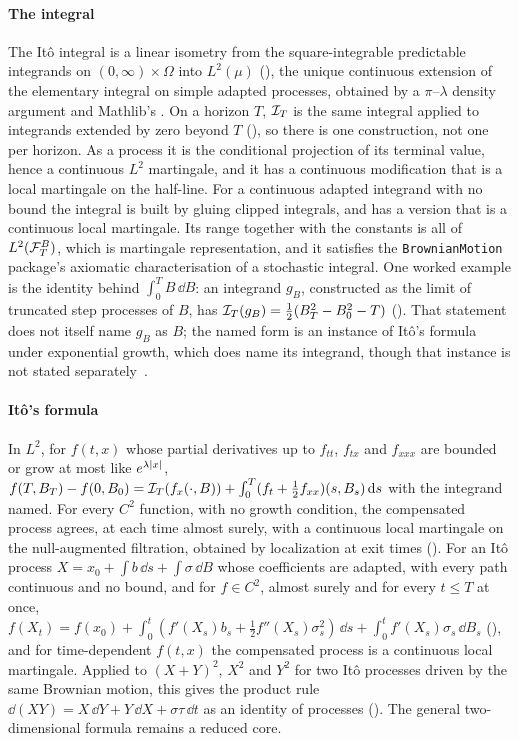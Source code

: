 \documentclass[11pt]{article}
\begin{document}
\paragraph{The integral}
The It\^o integral is a linear isometry from the square-integrable predictable integrands on $(0,\infty)\times\Omega$
into $L^2(\mu)$ (), the unique continuous extension of the elementary integral on simple adapted
processes, obtained by a $\pi$--$\lambda$ density argument and Mathlib's . On a horizon $T$,
$\mathcal{I}_T$ is the same integral applied to integrands extended by zero beyond $T$ (), so there is one
construction, not one per horizon. As a process it is
the conditional projection of its terminal value, hence a continuous $L^2$ martingale, and it has a continuous
modification that is a local martingale on the half-line. For a continuous adapted integrand with no bound the integral
is built by gluing clipped integrals, and has a version that is a continuous local martingale. Its range together with
the constants is all of $L^2(\mathcal{F}^B_T)$, which is martingale representation, and it satisfies the \texttt{BrownianMotion}
package's axiomatic characterisation of a stochastic integral. One worked example is the identity behind
$\int_0^TB\,\dd B$: an integrand $g_B$, constructed as the limit of truncated step processes of $B$, has
$\mathcal{I}_T(g_B)=\frac12(B_T^2-B_0^2-T)$ (). That statement does not itself name $g_B$ as $B$; the
named form is an instance of It\^o's formula under exponential growth, which does name its integrand, though that
instance is not stated separately~\cite{CoelhoIto}.

\paragraph{It\^o's formula}
In $L^2$, for $f(t,x)$ whose partial derivatives up to $f_{tt}$, $f_{tx}$ and $f_{xxx}$ are bounded or grow at most like
$e^{\lambda\lvert x\rvert}$, $f(T,B_T)-f(0,B_0)=\mathcal{I}_T(f_x(\cdot,B))+\int_0^T(f_t+\frac12f_{xx})(s,B_s)\,\mathrm{d} s$ with the integrand
named. For every $C^2$ function, with no growth condition, the compensated process agrees, at each time almost surely, with a continuous local martingale on the null-augmented filtration, obtained by localization at exit times (). For an It\^o process
$X=x_0+\int b\,\dd s+\int\sigma\,\dd B$ whose coefficients are adapted, with every path continuous and no bound, and for
$f\in C^2$, almost surely and for every $t\le T$ at once,
$f(X_t)=f(x_0)+\int_0^t(f'(X_s)b_s+\frac12f''(X_s)\sigma_s^2)\,\dd s+\int_0^tf'(X_s)\sigma_s\,\dd B_s$
(), and for time-dependent $f(t,x)$ the compensated process is a continuous
local martingale. Applied to $(X+Y)^2$, $X^2$ and $Y^2$ for two It\^o processes driven by the same Brownian motion, this
gives the product rule $\dd(XY)=X\,\dd Y+Y\,\dd X+\sigma\tau\,\dd t$ as an identity of processes
(). The general two-dimensional formula remains a reduced core.
\end{document}
